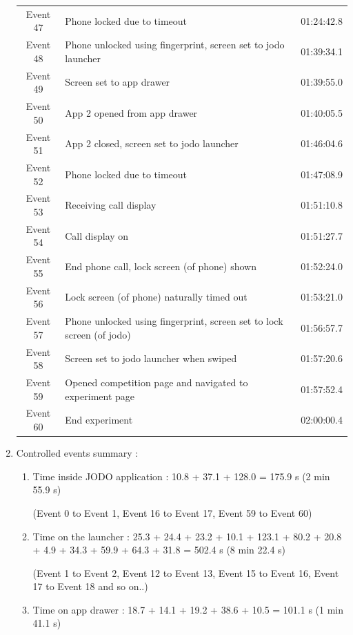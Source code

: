 \documentclass{article}
\begin{document}
\begin{enumerate}
\begin{longtable}{c p{8cm} p{3cm}}
            Event 47 & Phone locked due to timeout & 01:24:42.8 \\
            Event 48 & Phone unlocked using fingerprint, screen set to jodo launcher & 01:39:34.1 \\
            Event 49 & Screen set to app drawer & 01:39:55.0 \\
            Event 50 & App 2 opened from app drawer & 01:40:05.5 \\
            Event 51 & App 2 closed, screen set to jodo launcher & 01:46:04.6 \\
            Event 52 & Phone locked due to timeout & 01:47:08.9 \\
            Event 53 & Receiving call display & 01:51:10.8 \\
            Event 54 & Call display on & 01:51:27.7 \\
            Event 55 & End phone call, lock screen (of phone) shown & 01:52:24.0 \\
            Event 56 & Lock screen (of phone) naturally timed out & 01:53:21.0 \\
            Event 57 & Phone unlocked using fingerprint, screen set to lock screen (of jodo) & 01:56:57.7 \\
            Event 58 & Screen set to jodo launcher when swiped & 01:57:20.6 \\
            Event 59 & Opened competition page and navigated to experiment page & 01:57:52.4 \\
            Event 60 & End experiment & 02:00:00.4 \\

    \end{longtable}

    \item Controlled events summary :
    \begin{enumerate}
        \item Time inside JODO application : 10.8 + 37.1 + 128.0 = 175.9 s (2 min 55.9 s)

        (Event 0 to Event 1, Event 16 to Event 17, Event 59 to Event 60)

        \item Time on the launcher : 25.3 + 24.4 + 23.2 + 10.1 + 123.1 + 80.2 + 20.8 + 4.9 + 34.3 + 59.9 + 64.3 + 31.8 = 502.4 s (8 min 22.4 s)

        (Event 1 to Event 2, Event 12 to Event 13, Event 15 to Event 16, Event 17 to Event 18 and so on..)

        \item Time on app drawer : 18.7 + 14.1 + 19.2 + 38.6 + 10.5 = 101.1 s (1 min 41.1 s)


\end{enumerate}
\end{enumerate}
\end{document}
